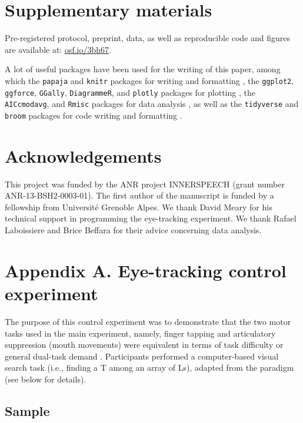 \documentclass[12pt,]{book}
\begin{document}
\hypertarget{supp}{\section{Supplementary materials}\label{supp}}

Pre-registered protocol, preprint, data, as well as reproducible code
and figures are available at: \href{http://osf.io/3bh67}{osf.io/3bh67}.

A lot of useful packages have been used for the writing of this paper,
among which the \texttt{papaja} and \texttt{knitr} packages for writing
and formatting \citep{R-papaja, R-knitr}, the \texttt{ggplot2},
\texttt{ggforce}, \texttt{GGally}, \texttt{DiagrammeR}, and
\texttt{plotly} packages for plotting
\citep{R-ggplot2, R-ggforce, R-GGally, R-DiagrammeR, R-plotly}, the
\texttt{AICcmodavg}, and \texttt{Rmisc} packages for data analysis
\citep{R-AICcmodavg, R-Rmisc}, as well as the \texttt{tidyverse} and
\texttt{broom} packages for code writing and formatting
\citep{R-broom, R-tidyverse}.

\section{Acknowledgements}\label{acknowledgements-1}

This project was funded by the ANR project INNERSPEECH (grant number
ANR-13-BSH2-0003-01). The first author of the manuscript is funded by a
fellowship from Université Grenoble Alpes. We thank David Meary for his
technical support in programming the eye-tracking experiment. We thank
Rafael Laboissiere and Brice Beffara for their advice concerning data
analysis.

\section{Appendix A. Eye-tracking control
experiment}\label{appendix-a.-eye-tracking-control-experiment}

The purpose of this control experiment was to demonstrate that the two
motor tasks used in the main experiment, namely, finger tapping and
articulatory suppression (mouth movements) were equivalent in terms of
task difficulty or general dual-task demand \citep{Emerson2003}.
Participants performed a computer-based visual search task (i.e.,
finding a T among an array of Ls), adapted from the \citet{Treisman1980}
paradigm (see below for details).

\subsection{Sample}\label{sample-1}
\end{document}
